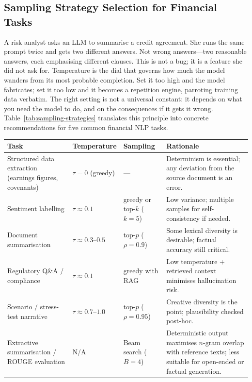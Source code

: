 \subsection{Sampling Strategy Selection for Financial Tasks}
\label{sec:sampling-finance}

\begin{context}

A risk analyst asks an LLM to summarise a credit agreement.  She runs the same
prompt twice and gets two different answers.  Not wrong answers---two reasonable
answers, each emphasising different clauses.  This is not a bug; it is a feature
she did not ask for.  Temperature is the dial that governs how much the model
wanders from its most probable completion.  Set it too high and the model
fabricates; set it too low and it becomes a repetition engine, parroting training
data verbatim.  The right setting is not a universal constant: it depends on what
you need the model to do, and on the consequences if it gets it wrong.
Table~\ref{tab:sampling-strategies} translates this principle into concrete
recommendations for five common financial NLP tasks.

\begin{center}
\small
\begin{tabularx}{\linewidth}{X l l X}
\toprule
\textbf{Task} & \textbf{Temperature} & \textbf{Sampling} & \textbf{Rationale} \\
\midrule
Structured data extraction
  (earnings figures, covenants)
  & $\tau = 0$ (greedy)
  & ---
  & Determinism is essential; any deviation from the source document is an error. \\[4pt]
Sentiment labelling
  & $\tau \approx 0.1$
  & greedy or top-$k$ ($k=5$)
  & Low variance; multiple samples for self-consistency if needed. \\[4pt]
Document summarisation
  & $\tau \approx 0.3$--$0.5$
  & top-$p$ ($\rho = 0.9$)
  & Some lexical diversity is desirable; factual accuracy still critical. \\[4pt]
Regulatory Q\&A / compliance
  & $\tau \approx 0.1$
  & greedy with RAG
  & Low temperature + retrieved context minimises hallucination risk. \\[4pt]
Scenario / stress-test narrative
  & $\tau \approx 0.7$--$1.0$
  & top-$p$ ($\rho = 0.95$)
  & Creative diversity is the point; plausibility checked post-hoc. \\[4pt]
Extractive summarisation / ROUGE evaluation
  & N/A
  & Beam search ($B = 4$)
  & Deterministic output maximises $n$-gram overlap with reference texts;
    less suitable for open-ended or factual generation. \\
\bottomrule
\end{tabularx}
\label{tab:sampling-strategies}
\end{center}


\end{context}
